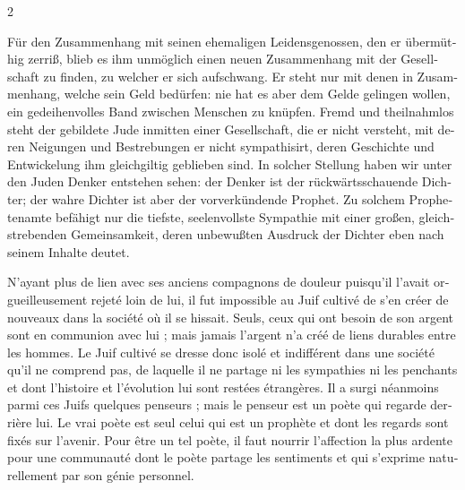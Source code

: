\documentclass[a4paper,12pt]{article}
\newcommand\chunks[2]{%
\begin{leftcolumn*}\begin{otherlanguage}{german}%
{#1}%
\end{otherlanguage}\end{leftcolumn*}%
\begin{rightcolumn}\begin{otherlanguage}{french}%
{#2}%
\end{otherlanguage}\end{rightcolumn}%
}
\begin{document}
\begin{paracol}{2}
  \chunks{Für den Zusammenhang mit seinen ehemaligen Leidensgenossen, den er übermüthig zerriß, blieb es ihm unmöglich einen neuen Zusammenhang mit der Gesellschaft zu finden, zu welcher er sich aufschwang. Er steht nur mit denen in Zusammenhang, welche sein Geld bedürfen: nie hat es aber dem Gelde gelingen wollen, ein gedeihenvolles Band zwischen Menschen zu knüpfen. Fremd und theilnahmlos steht der gebildete Jude inmitten einer Gesellschaft, die er nicht versteht, mit deren Neigungen und Bestrebungen er nicht sympathisirt, deren Geschichte und Entwickelung ihm gleichgiltig geblieben sind. In solcher Stellung haben wir unter den Juden Denker entstehen sehen: der Denker ist der rückwärtsschauende Dichter; der wahre Dichter ist aber der vorverkündende Prophet. Zu solchem Prophetenamte befähigt nur die tiefste, seelenvollste Sympathie mit einer großen, gleichstrebenden Gemeinsamkeit, deren unbewußten Ausdruck der Dichter eben nach seinem Inhalte deutet.}
         {N’ayant plus de lien avec ses anciens compagnons de douleur puisqu’il l’avait orgueilleusement rejeté loin de lui, il fut impossible au Juif cultivé de s’en créer de nouveaux dans la société où il se hissait. Seuls, ceux qui ont besoin de son argent sont en communion avec lui ; mais jamais l’argent n’a créé de liens durables entre les hommes. Le Juif cultivé se dresse donc isolé et indifférent dans une société qu’il ne comprend pas, de laquelle il ne partage ni les sympathies ni les penchants et dont l’histoire et l’évolution lui sont restées étrangères. Il a surgi néanmoins parmi ces Juifs quelques penseurs ; mais le penseur est un poète qui regarde derrière lui. Le vrai poète est seul celui qui est un prophète et dont les regards sont fixés sur l’avenir. Pour être un tel poète, il faut nourrir l’affection la plus ardente pour une communauté dont le poète partage les sentiments et qui s’exprime naturellement par son génie personnel.}

\end{paracol}
\end{document}
